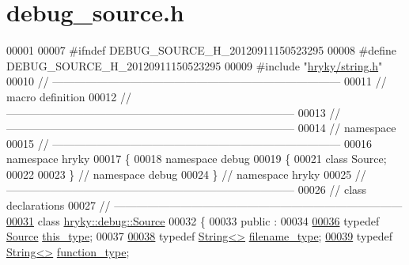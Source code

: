 \hypertarget{debug__source_8h_source}{\section{debug\-\_\-source.\-h}
}

\begin{DoxyCode}
00001 
00007 \textcolor{preprocessor}{#ifndef DEBUG\_SOURCE\_H\_20120911150523295}
00008 \textcolor{preprocessor}{}\textcolor{preprocessor}{#define DEBUG\_SOURCE\_H\_20120911150523295}
00009 \textcolor{preprocessor}{}\textcolor{preprocessor}{#include "\hyperlink{string_8h}{hryky/string.h}"}
00010 \textcolor{comment}{//
      ------------------------------------------------------------------------------}
00011 \textcolor{comment}{// macro definition}
00012 \textcolor{comment}{//
      ------------------------------------------------------------------------------}
00013 \textcolor{comment}{//
      ------------------------------------------------------------------------------}
00014 \textcolor{comment}{// namespace}
00015 \textcolor{comment}{//
      ------------------------------------------------------------------------------}
00016 \textcolor{keyword}{namespace }hryky
00017 \{
00018 \textcolor{keyword}{namespace }debug
00019 \{
00021     \textcolor{keyword}{class }Source;
00022 
00023 \} \textcolor{comment}{// namespace debug}
00024 \} \textcolor{comment}{// namespace hryky}
00025 \textcolor{comment}{//
      ------------------------------------------------------------------------------}
00026 \textcolor{comment}{// class declarations}
00027 \textcolor{comment}{//
      ------------------------------------------------------------------------------}
\hypertarget{debug__source_8h_source_l00031}{}\hyperlink{classhryky_1_1debug_1_1_source}{00031} \textcolor{comment}{}\textcolor{keyword}{class }\hyperlink{classhryky_1_1debug_1_1_source}{hryky::debug::Source}
00032 \{
00033 \textcolor{keyword}{public} :
00034 
\hypertarget{debug__source_8h_source_l00036}{}\hyperlink{classhryky_1_1debug_1_1_source_a0c8dff3e624cee6e70d983de9e346cf9}{00036}     \textcolor{keyword}{typedef} \hyperlink{classhryky_1_1debug_1_1_source}{Source}  \hyperlink{classhryky_1_1debug_1_1_source_a0c8dff3e624cee6e70d983de9e346cf9}{this_type};
00037 
\hypertarget{debug__source_8h_source_l00038}{}\hyperlink{classhryky_1_1debug_1_1_source_a443943cd6616be5b4a0c7e200ced19ce}{00038}     \textcolor{keyword}{typedef} \hyperlink{classhryky_1_1_string}{String<>}    \hyperlink{classhryky_1_1debug_1_1_source_a443943cd6616be5b4a0c7e200ced19ce}{filename_type};  
\hypertarget{debug__source_8h_source_l00039}{}\hyperlink{classhryky_1_1debug_1_1_source_ae9faf9b2e482bf46211ced4e9a5e4680}{00039}     \textcolor{keyword}{typedef} \hyperlink{classhryky_1_1_string}{String<>}    \hyperlink{classhryky_1_1debug_1_1_source_ae9faf9b2e482bf46211ced4e9a5e4680}{function_type};  

\end{DoxyCode}
